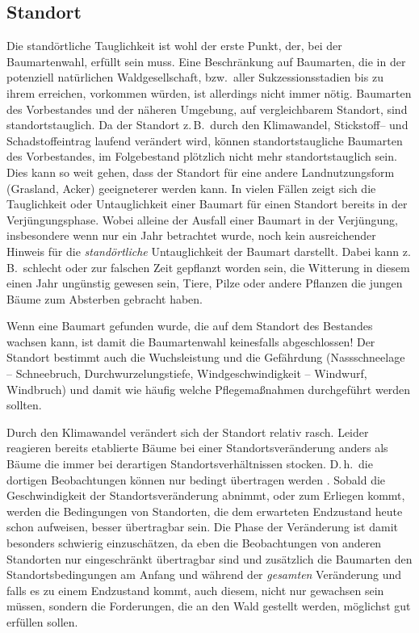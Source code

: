 \documentclass[twocolumn]{scrartcl}
\begin{document}
\subsection{Standort}
\label{ssec:standort}

Die standörtliche Tauglichkeit ist wohl der erste Punkt, der, bei der
Baumartenwahl, erfüllt sein muss. Eine Beschränkung auf Baumarten, die in der
potenziell natürlichen Waldgesellschaft, bzw.\ aller Sukzessionsstadien bis zu
ihrem erreichen, vorkommen würden, ist allerdings nicht immer nötig. Baumarten
des Vorbestandes und der näheren Umgebung, auf vergleichbarem Standort, sind
standortstauglich. Da der Standort z.\,B.\ durch den Klimawandel, Stickstoff-- und
Schadstoffeintrag laufend verändert wird, können standortstaugliche Baumarten
des Vorbestandes, im Folgebestand plötzlich nicht mehr standortstauglich sein.
Dies kann so weit gehen, dass der Standort für eine andere Landnutzungsform
(Grasland, Acker) geeigneterer werden kann. In vielen Fällen zeigt sich die
Tauglichkeit oder Untauglichkeit einer Baumart für einen Standort bereits in der
Verjüngungsphase. Wobei alleine der Ausfall einer Baumart in der Verjüngung,
insbesondere wenn nur ein Jahr betrachtet wurde, noch kein ausreichender Hinweis
für die \emph{standörtliche} Untauglichkeit der Baumart darstellt. Dabei kann
z.\,B.\ schlecht oder zur falschen Zeit gepflanzt worden sein, die Witterung in
diesem einen Jahr ungünstig gewesen sein, Tiere, Pilze oder andere Pflanzen die
jungen Bäume zum Absterben gebracht haben.

Wenn eine Baumart gefunden wurde, die auf dem Standort des Bestandes
wachsen kann, ist damit die Baumartenwahl keinesfalls abgeschlossen!
Der Standort bestimmt auch die Wuchsleistung und die Gefährdung
(Nassschneelage -- Schneebruch, Durchwurzelungstiefe,
Windgeschwindigkeit -- Windwurf, Windbruch) und damit wie häufig
welche Pflegemaßnahmen durchgeführt werden sollten.

Durch den Klimawandel verändert sich der Standort relativ
rasch. Leider reagieren bereits etablierte Bäume bei einer
Standortsveränderung anders als Bäume die immer bei derartigen
Standortsverhältnissen stocken. D.\,h.\ die dortigen Beobachtungen können
nur bedingt übertragen werden \cite{yue2022SiteIndex}. Sobald die
Geschwindigkeit der Standortsveränderung abnimmt, oder zum Erliegen
kommt, werden die Bedingungen von Standorten, die dem erwarteten Endzustand
heute schon aufweisen, besser übertragbar sein. Die Phase der
Veränderung ist damit besonders schwierig einzuschätzen, da eben die
Beobachtungen von anderen Standorten nur eingeschränkt übertragbar
sind und zusätzlich die Baumarten den Standortsbedingungen am Anfang
und während der \emph{gesamten} Veränderung und falls es zu einem
Endzustand kommt, auch diesem, nicht nur gewachsen sein müssen, sondern
die Forderungen, die an den Wald gestellt werden, möglichst gut
erfüllen sollen.
\end{document}
